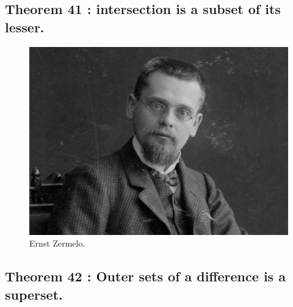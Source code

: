 \documentclass[preview]{standalone}
\begin{document}
\subsection[Intersection is a subset of its lesser.]
    {
        \color{section}Theorem 41 \color{black} : intersection is a subset of its lesser.
    }

\pagebreak


\begin{figure}[!h]
    \centering
    \includegraphics[width=13.5cm]{../resources/jpg/2.2.set.operations/zermelo.jpg}
    \caption*{Ernst Zermelo.}
\end{figure}
\subsection[Outermost sets in a difference is a superset.]
    {
        \color{section}Theorem 42 \color{black} : Outer sets of a difference is a superset.
    }

\pagebreak


\end{document}
